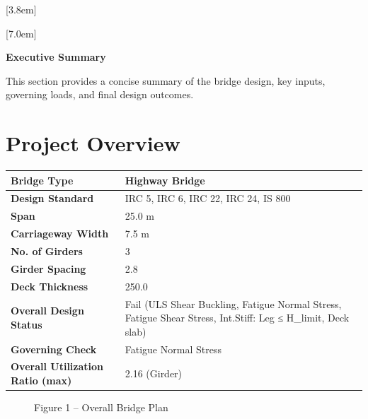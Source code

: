 \documentclass[12pt,a4paper]{report}
\numberwithin{table}{chapter}
\numberwithin{figure}{chapter}
\begin{document}
[3.8em]
  {\normalfont}
  {\contentslabel{2.3em}}
  {\hspace*{-2.3em}}
  {\hfill\contentspage}

[7.0em]
  {\normalfont}
  {\contentslabel{3.2em}}
  {\hspace*{-3.2em}}
  {\hfill\contentspage}

\newpage
\renewcommand{\contentsname}{\centering\Large\bfseries Table of Contents}
\tableofcontents


\newpage
{\centering\Large\bfseries Executive Summary\par}
\vspace{0.8em}

This section provides a concise summary of the bridge design, key inputs, governing loads, and final design outcomes.

\section*{Project Overview}
\label{sec:project-overview}


\begin{tabular}{|L{5.5cm}|L{8.5cm}|}
\hline
\textbf{Bridge Type} & Highway Bridge \\
\hline
\textbf{Design Standard} & IRC 5, IRC 6, IRC 22, IRC 24, IS 800 \\
\hline
\textbf{Span} & 25.0 m \\
\hline
\textbf{Carriageway Width} & 7.5 m \\
\hline
\textbf{No. of Girders} & 3 \\
\hline
\textbf{Girder Spacing} & 2.8 \\
\hline
\textbf{Deck Thickness} & 250.0 \\
\hline
\textbf{Overall Design Status} & Fail (ULS Shear Buckling, Fatigue Normal Stress, Fatigue Shear Stress, Int.Stiff:\allowbreak{} Leg ≤ H\_\allowbreak{}limit, Deck slab) \\
\hline
\textbf{Governing Check} & Fatigue Normal Stress \\
\hline
\textbf{Overall Utilization Ratio (max)} & 2.16 (Girder) \\
\hline
\end{tabular}


\begin{figure}[H]
\centering
{}
\caption*{Figure 1 -- Overall Bridge Plan}
\end{figure}
\end{document}
